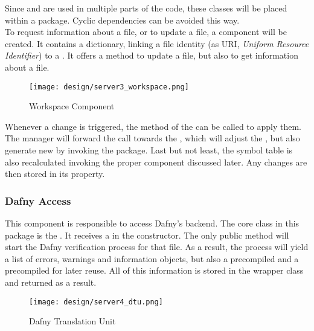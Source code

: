 Since  and  are used in multiple parts of the code, these classes will be placed within a  package.
Cyclic dependencies can be avoided this way.\\

To request information about a file, or to update a file, a component  will be created.
It contains a dictionary, linking a file identity (as URI, \textit{Uniform Resource Identifier})
to a . 
It offers a method to update a file, but also to get information about a file.\\

\begin{figure}[ht]
    \centering
    \texttt{[image: design/server3\_workspace.png]}
    \caption{Workspace Component}
    \label{fig:server_workspace}
\end{figure}

Whenever a change is triggered, the  method of the  can be called to apply them.
The manager will forward the call towards the , which will adjust the \linebreak {},
but also generate new  by invoking the  package.
Last but not least, the symbol table is also recalculated invoking the proper component discussed later.
Any changes are then stored in its  property.\\

\subsubsection{Dafny Access}
This component is responsible to access Dafny's backend.
The core class in this package is the \linebreak {}.
It receives a  in the constructor.
The only public method  will start the Dafny verification process for that file.
As a result, the process will yield a list of errors, warnings and information objects, but also a precompiled  and a precompiled  for later reuse.
All of this information is stored in the  wrapper class and returned as a result.\\

\begin{figure}[H]
    \centering
    \texttt{[image: design/server4\_dtu.png]}
    \caption{Dafny Translation Unit}
    \label{fig:server_dtu}
\end{figure}



